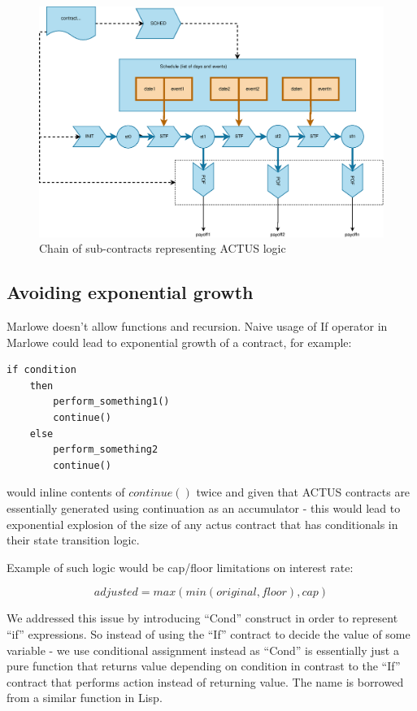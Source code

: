 \documentclass[runningheads]{llncs}
\begin{document}
\begin{figure}
\includegraphics[width=1\textwidth]{images/flowchart} \caption{Chain of sub-contracts representing ACTUS logic}
\label{fig2} 
\end{figure}


\subsection{Avoiding exponential growth }

Marlowe doesn't allow functions and recursion. Naive usage of If operator
in Marlowe could lead to exponential growth of a contract, for example:

\begin{verbatim}
if condition 
	then 
		perform_something1()
		continue() 
	else 
		perform_something2 
		continue()
\end{verbatim}

would inline contents of $continue()$ twice and given that ACTUS
contracts are essentially generated using continuation as an accumulator
- this would lead to exponential explosion of the size of any actus
contract that has conditionals in their state transition logic.

Example of such logic would be cap/floor limitations on interest rate:

\noindent 
\begin{equation}
adjusted=max(min(original,floor),cap)
\end{equation}

We addressed this issue by introducing ``Cond'' construct in order
to represent ``if'' expressions. So instead of using the ``If''
contract to decide the value of some variable - we use conditional
assignment instead as ``Cond'' is essentially just a pure function
that returns value depending on condition in contrast to the ``If''
contract that performs action instead of returning value. The name
is borrowed from a similar function in Lisp.
\end{document}
